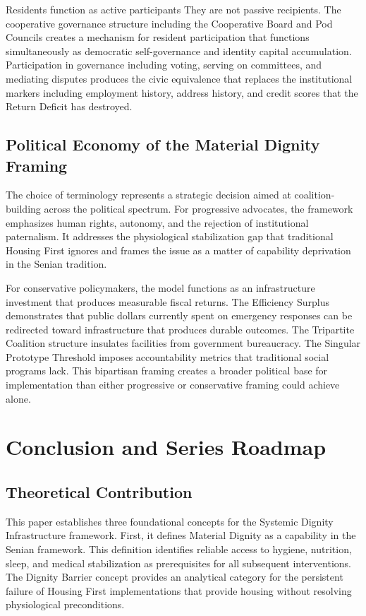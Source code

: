\documentclass[12pt, letterpaper]{article}
\begin{document}
Residents function as active participants They are not passive recipients. The cooperative governance structure including the Cooperative Board and Pod Councils creates a mechanism for resident participation that functions simultaneously as democratic self-governance and identity capital accumulation. Participation in governance including voting, serving on committees, and mediating disputes produces the civic equivalence that replaces the institutional markers including employment history, address history, and credit scores that the Return Deficit has destroyed.

\subsection{Political Economy of the Material Dignity Framing}

The choice of terminology represents a strategic decision aimed at coalition-building across the political spectrum. For progressive advocates, the framework emphasizes human rights, autonomy, and the rejection of institutional paternalism. It addresses the physiological stabilization gap that traditional Housing First ignores and frames the issue as a matter of capability deprivation in the Senian tradition.

For conservative policymakers, the model functions as an infrastructure investment that produces measurable fiscal returns. The Efficiency Surplus demonstrates that public dollars currently spent on emergency responses can be redirected toward infrastructure that produces durable outcomes. The Tripartite Coalition structure insulates facilities from government bureaucracy. The Singular Prototype Threshold imposes accountability metrics that traditional social programs lack. This bipartisan framing creates a broader political base for implementation than either progressive or conservative framing could achieve alone.

\newpage
\section{Conclusion and Series Roadmap}

\subsection{Theoretical Contribution}

This paper establishes three foundational concepts for the Systemic Dignity Infrastructure framework. First, it defines Material Dignity as a capability in the Senian framework. This definition identifies reliable access to hygiene, nutrition, sleep, and medical stabilization as prerequisites for all subsequent interventions. The Dignity Barrier concept provides an analytical category for the persistent failure of Housing First implementations that provide housing without resolving physiological preconditions.
\end{document}
